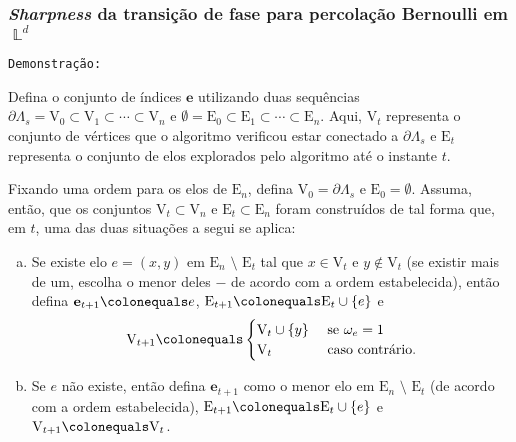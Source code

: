 \documentclass[9pt]{beamer}
\theoremstyle{definition} %
\DeclareMathOperator{\LX}{\mathbb{L}} %
\begin{document}
	\begin{frame}[t]
		\frametitle{\textit{Sharpness} da transição de fase para percolação Bernoulli em $\LX^d$}
		\texttt{Demonstração:}
		
		Defina o conjunto de índices $\mathbf{e}$ utilizando duas sequências $\partial\Lambda_s = \text{V}_0 \subset \text{V}_1 \subset \cdots \subset \text{V}_n$ e $\emptyset = \text{E}_0 \subset \text{E}_1 \subset \cdots \subset \text{E}_n$. Aqui, $\text{V}_t$ representa o conjunto de vértices que o algoritmo verificou estar conectado a $\partial\Lambda_s$ e $\text{E}_t$ representa o conjunto de elos explorados pelo algoritmo até o instante $t$.\pause
		
		Fixando uma ordem para os elos de $\text{E}_n$, defina $\text{V}_0 = \partial\Lambda_s$ e $\text{E}_0 = \emptyset$. Assuma, então, que os conjuntos $\text{V}_t \subset \text{V}_n$ e $\text{E}_t \subset \text{E}_n$ foram construídos de tal forma que, em $t$, uma das duas situações a segui se aplica:
		
		\begin{enumerate}[a.]
			\item Se existe elo $e = (x, y)$ em $\text{E}_n \text{~\textbackslash~} \text{E}_t$ tal que $x \in \text{V}_t$ e $y \not\in \text{V}_t$ (se existir mais de um, escolha o menor deles $-$ de acordo com a ordem estabelecida), então defina $\mathbf{e}_{t+1} \colonequals e$, $\text{E}_{t + 1} \colonequals \text{E}_t \cup \{e\}$ e
			\[ \text{V}_{t + 1} \colonequals
			\begin{cases}
			\text{V}_t \cup \{y\} &\text{ se } \omega_e = 1 \\
			\text{V}_t &\text{ caso contrário}.
			\end{cases}
			\]
			\item Se $e$ não existe, então defina $\mathbf{e}_{t+1}$ como o menor elo em $\text{E}_n \text{~\textbackslash~} \text{E}_t$ (de acordo com a ordem estabelecida), $\text{E}_{t + 1} \colonequals \text{E}_t \cup \{e\}$ e $\text{V}_{t + 1} \colonequals \text{V}_t$.
		\end{enumerate}
	\end{frame}
\end{document}
